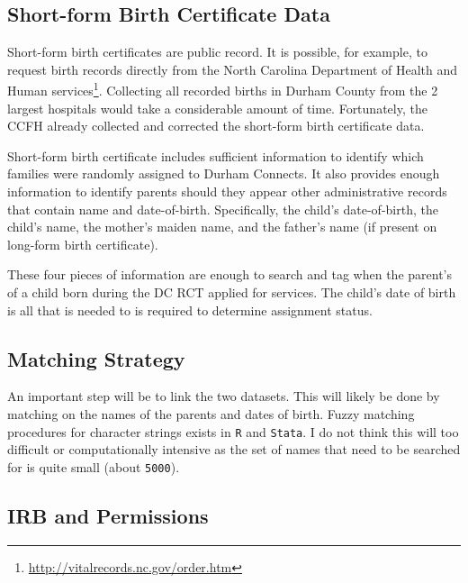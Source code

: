 \documentclass[12pt,letterpaperpaper,]{book}
\renewcommand{\href}[2]{#2\footnote{\url{#1}}}
\begin{document}
\subsection*{Short-form Birth Certificate
Data}\label{short-form-birth-certificate-data}

Short-form birth certificates are public record. It is possible, for
example, to request birth records directly from the
\href{http://vitalrecords.nc.gov/order.htm}{North Carolina Department of
Health and Human services}. Collecting all recorded births in Durham
County from the 2 largest hospitals would take a considerable amount of
time. Fortunately, the CCFH already collected and corrected the
short-form birth certificate data.

Short-form birth certificate includes sufficient information to identify
which families were randomly assigned to Durham Connects. It also
provides enough information to identify parents should they appear other
administrative records that contain name and date-of-birth.
Specifically, the child's date-of-birth, the child's name, the mother's
maiden name, and the father's name (if present on long-form birth
certificate).

These four pieces of information are enough to search and tag when the
parent's of a child born during the DC RCT applied for services. The
child's date of birth is all that is needed to is required to determine
assignment status.

\subsection*{Matching Strategy}\label{matching-strategy}

An important step will be to link the two datasets. This will likely be
done by matching on the names of the parents and dates of birth. Fuzzy
matching procedures for character strings exists in \texttt{R} and
\texttt{Stata}. I do not think this will too difficult or
computationally intensive as the set of names that need to be searched
for is quite small (about \texttt{5000}).

\subsection*{IRB and Permissions}\label{irb-and-permissions}
\end{document}
